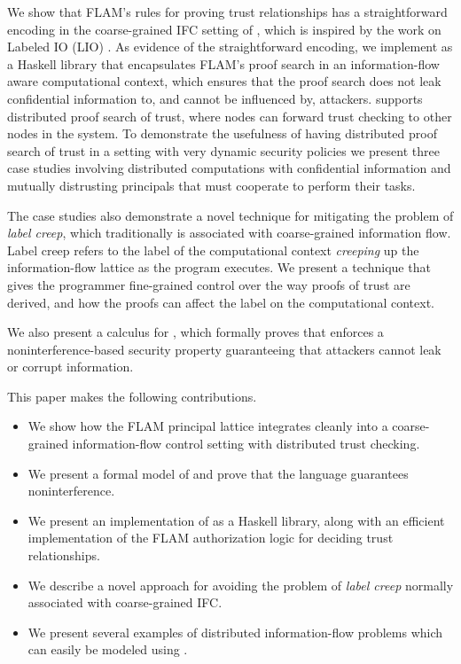 We show that FLAM's rules for proving trust relationships has a straightforward encoding in the coarse-grained IFC setting of \lang{}, which is inspired by the work on Labeled IO (LIO) \cite{SRMMlio}. As evidence of the straightforward encoding, we implement \lang{} as a Haskell library that encapsulates FLAM's proof search in an information-flow aware computational context, which ensures that the proof search does not leak confidential information to, and cannot be influenced by, attackers. \lang{} supports distributed proof search of trust, where nodes can forward trust checking to other nodes in the system. To demonstrate the usefulness of having distributed proof search of trust in a setting with very dynamic security policies we present three case studies involving distributed computations with confidential information and mutually distrusting principals that must cooperate to perform their tasks.

The case studies also demonstrate a novel technique for mitigating the problem of \emph{label creep}, which traditionally is associated with coarse-grained information flow. Label creep refers to the label of the computational context \emph{creeping} up the information-flow lattice as the program executes. We present a technique that gives the programmer fine-grained control over the way proofs of trust are derived, and how the proofs can affect the label on the computational context.

We also present a calculus for \lang{}, which formally proves that \lang{} enforces a noninterference-based \cite{6234468} security property guaranteeing that attackers cannot leak or corrupt information.

This paper makes the following contributions.
\begin{itemize}
    \item We show how the FLAM principal lattice integrates cleanly into a coarse-grained information-flow control setting with distributed trust checking.
    \item We present a formal model of \lang{} and prove that the language guarantees noninterference.
    \item We present an implementation of \lang{} as a Haskell library, along with an efficient implementation of the FLAM authorization logic for deciding trust relationships.
    \item We describe a novel approach for avoiding the problem of \emph{label creep} normally associated with coarse-grained IFC.
    \item We present several examples of distributed information-flow problems which can easily be modeled using \lang.
\end{itemize}


